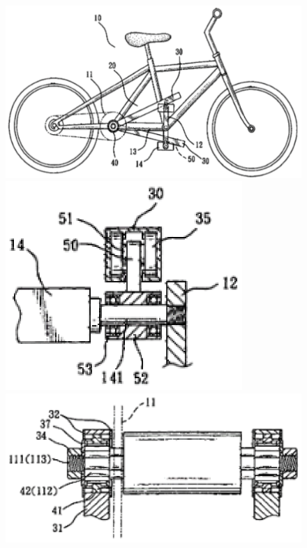 \documentclass[10pt, a4paper]{article}
\begin{document}
{		\begin{figure}[!h]
			\begin{minipage}{0.49\textwidth}
				\centering
				\includegraphics[width=\textwidth]{figures/fig3.png}
				\caption{}
			\end{minipage}
			\begin{minipage}{0.49\textwidth}
				\centering
				\begin{minipage}{0.49\textwidth}
					\centering
					\includegraphics[width=0.8\textwidth]{figures/fig4.png}
					\caption{}
				\end{minipage}
				\begin{minipage}{0.49\textwidth}
					\centering
					\includegraphics[width=1.1\textwidth]{figures/fig5.png}

\end{minipage}
\end{minipage}
\end{figure}}
\end{document}
